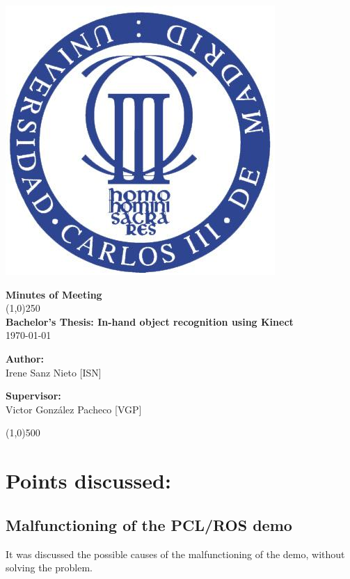 \documentclass{article}
\newenvironment{myindentpar}[1]%
 {\begin{list}{}%
         {\setlength{\leftmargin}{#1}}%
         \item[]%
 }
 {\end{list}}
\begin{document}
\includegraphics[width=0.1\linewidth]{../template/uc3m.jpg}

\vspace{-1cm}
\begin{minipage}[b]{1\linewidth}
	\begin{center}
	{\Huge \bfseries{Minutes of Meeting}}\\
	\line(1,0){250}\\[1cm]
	{\LARGE \textbf{Bachelor's Thesis: In-hand object recognition using Kinect}}\\[0.5cm]
	{\large \today}
	\end{center}
\end {minipage}



\begin{minipage}{0.55\textwidth}
\begin{flushleft} \large
\textbf{{Author:}\\}
Irene Sanz Nieto [ISN]\\
\end{flushleft}
\end{minipage}
\begin{minipage}{0.4\textwidth}
\begin{flushright} \large
\textbf{Supervisor: }\\
Victor González Pacheco [VGP]
\end{flushright}\end{minipage}

\begin{center}
\line(1,0){500}
\end{center}

\renewcommand{\thesubsection}
{\hspace*{1cm} \arabic{section}.\arabic{subsection}}



\section{\LARGE Points discussed: }
	\subsection{Malfunctioning of the PCL/ROS demo}
		\begin{myindentpar}{1cm} 
		It was discussed the possible causes of the malfunctioning of the demo, without solving the problem. 
		\end{myindentpar}
\end{document}
